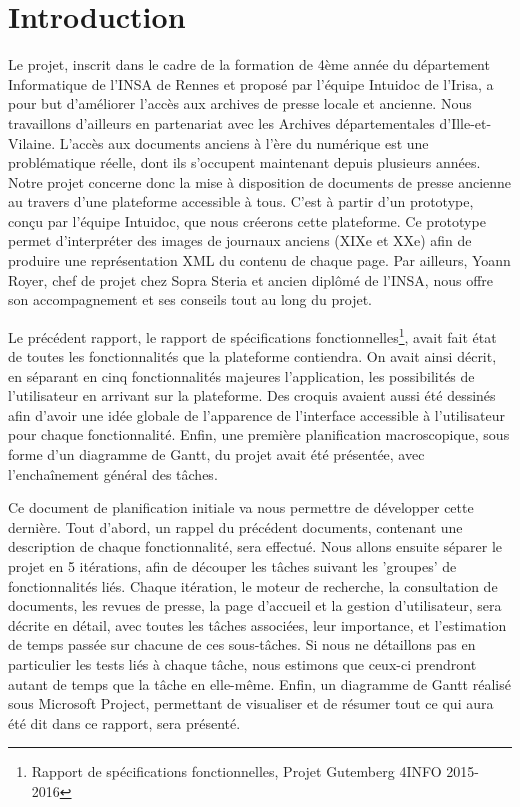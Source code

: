 \section{Introduction}
\label{sec:intro}
	
	Le projet, inscrit dans le cadre de la formation de 4ème année du département Informatique de l’INSA de Rennes et proposé par l’équipe Intuidoc de l’Irisa, a pour but d’améliorer l’accès aux archives de presse locale et ancienne. Nous travaillons d'ailleurs en partenariat avec les Archives départementales d'Ille-et-Vilaine. L'accès aux documents anciens à l'ère du numérique est une problématique réelle, dont ils s'occupent maintenant depuis plusieurs années. Notre projet concerne donc la mise à disposition de documents de presse ancienne au travers d'une plateforme accessible à tous. C'est à partir d'un prototype, conçu par l'équipe Intuidoc, que nous créerons cette plateforme. Ce prototype permet d'interpréter des images de journaux anciens (XIXe et XXe) afin de produire une représentation XML du contenu de chaque page. Par ailleurs, Yoann Royer, chef de projet chez Sopra Steria et ancien diplômé de l'INSA, nous offre son accompagnement et ses conseils tout au long du projet.

	Le précédent rapport, le rapport de spécifications fonctionnelles\footnote{Rapport de spécifications fonctionnelles, Projet Gutemberg 4INFO 2015-2016}, avait fait état de toutes les fonctionnalités que la plateforme contiendra. On avait ainsi décrit, en séparant en cinq fonctionnalités majeures l'application, les possibilités de l'utilisateur en arrivant sur la plateforme. Des croquis avaient aussi été dessinés afin d'avoir une idée globale de l'apparence de l'interface accessible à l'utilisateur pour chaque fonctionnalité. Enfin, une première planification macroscopique, sous forme d'un diagramme de Gantt, du projet avait été présentée, avec l'enchaînement général des tâches.

	Ce document de planification initiale va nous permettre de développer cette dernière. Tout d'abord, un rappel du précédent documents, contenant une description de chaque fonctionnalité, sera effectué. Nous allons ensuite séparer le projet en 5 itérations, afin de découper les tâches suivant les 'groupes' de fonctionnalités liés. Chaque itération, le moteur de recherche, la consultation de documents, les revues de presse, la page d'accueil et la gestion d'utilisateur, sera décrite en détail, avec toutes les tâches associées, leur importance, et l'estimation de temps passée sur chacune de ces sous-tâches. Si nous ne détaillons pas en particulier les tests liés à chaque tâche, nous estimons que ceux-ci prendront autant de temps que la tâche en elle-même. Enfin, un diagramme de Gantt réalisé sous Microsoft Project, permettant de visualiser et de résumer tout ce qui aura été dit dans ce rapport, sera présenté.
